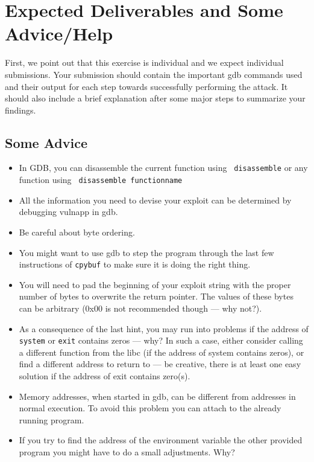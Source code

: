 \documentclass[a4paper,11pt]{article}
\begin{document}
\section*{Expected Deliverables and Some Advice/Help}

First, we point out that this exercise is individual and we expect individual
submissions. Your submission should contain the important gdb commands used and
their output for each step towards successfully performing the attack. It should
also include a brief explanation after some major steps to summarize your
findings.

\subsection*{Some Advice}
\begin{itemize}
\item In GDB, you can disassemble the current function using {\tt
      disassemble} or any function using {\tt
      disassemble functionname}
\item All the information you need to devise your exploit can be
  determined by debugging {\sc vulnapp} in gdb.
\item
Be careful about byte ordering.
\item
You might want to use {\sc gdb} to step the program through the last few
instructions of {\tt cpybuf} to make sure it is doing the right thing.
\item
You will need to pad the beginning of your exploit string with the proper number of
bytes to overwrite the return pointer. The values of these bytes can
be arbitrary (0x00 is not recommended though --- why not?).
\item As a consequence of the last hint, you may run into problems if
  the address of {\tt system} or {\tt exit} contains zeros --- why? In
  such a case, either consider calling a different function from the
  libc (if the address of system contains zeros), or find a different
  address to return to --- be creative, there is at least one easy
  solution if the address of exit contains zero(s).
\item Memory addresses, when started in gdb, can be different from addresses in
normal execution.  To avoid this problem you can attach to the already running
program.

\item If you try to find the address of the environment variable the other
provided program you might have to do a small adjustments. Why?


\end{itemize}
\end{document}
